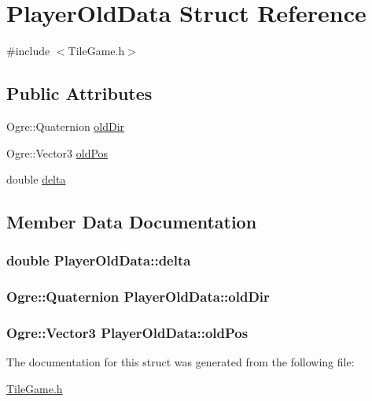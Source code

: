 \hypertarget{structPlayerOldData}{\section{Player\-Old\-Data Struct Reference}
\label{structPlayerOldData}
}


{\ttfamily \#include $<$Tile\-Game.\-h$>$}

\subsection*{Public Attributes}
\begin{DoxyCompactItemize}
\item 
Ogre\-::\-Quaternion \hyperlink{structPlayerOldData_a4df51090452b5e0a0c0963f74593b174}{old\-Dir}
\item 
Ogre\-::\-Vector3 \hyperlink{structPlayerOldData_a88512aa4d4af128cc35fe1fb22594b24}{old\-Pos}
\item 
double \hyperlink{structPlayerOldData_ab25ce0f25feb8ece5f893be75027305f}{delta}
\end{DoxyCompactItemize}


\subsection{Member Data Documentation}
\hypertarget{structPlayerOldData_ab25ce0f25feb8ece5f893be75027305f}{
\subsubsection[{delta}]{\setlength{\rightskip}{0pt plus 5cm}double Player\-Old\-Data\-::delta}}\label{structPlayerOldData_ab25ce0f25feb8ece5f893be75027305f}
\hypertarget{structPlayerOldData_a4df51090452b5e0a0c0963f74593b174}{
\subsubsection[{old\-Dir}]{\setlength{\rightskip}{0pt plus 5cm}Ogre\-::\-Quaternion Player\-Old\-Data\-::old\-Dir}}\label{structPlayerOldData_a4df51090452b5e0a0c0963f74593b174}
\hypertarget{structPlayerOldData_a88512aa4d4af128cc35fe1fb22594b24}{
\subsubsection[{old\-Pos}]{\setlength{\rightskip}{0pt plus 5cm}Ogre\-::\-Vector3 Player\-Old\-Data\-::old\-Pos}}\label{structPlayerOldData_a88512aa4d4af128cc35fe1fb22594b24}


The documentation for this struct was generated from the following file\-:\begin{DoxyCompactItemize}
\item 
\hyperlink{TileGame_8h}{Tile\-Game.\-h}\end{DoxyCompactItemize}

